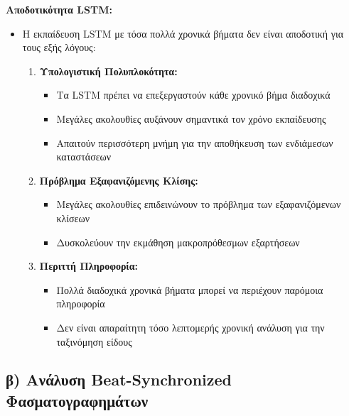 \documentclass[a4paper,12pt]{article}
\begin{document}
\textbf{Αποδοτικότητα LSTM:}
\begin{itemize}
   \item Η εκπαίδευση LSTM με τόσα πολλά χρονικά βήματα δεν είναι αποδοτική για τους εξής λόγους:
   \begin{enumerate}
       \item \textbf{Υπολογιστική Πολυπλοκότητα:}
       \begin{itemize}
           \item Τα LSTM πρέπει να επεξεργαστούν κάθε χρονικό βήμα διαδοχικά
           \item Μεγάλες ακολουθίες αυξάνουν σημαντικά τον χρόνο εκπαίδευσης
           \item Απαιτούν περισσότερη μνήμη για την αποθήκευση των ενδιάμεσων καταστάσεων
       \end{itemize}
       
       \item \textbf{Πρόβλημα Εξαφανιζόμενης Κλίσης:}
       \begin{itemize}
           \item Μεγάλες ακολουθίες επιδεινώνουν το πρόβλημα των εξαφανιζόμενων κλίσεων
           \item Δυσκολεύουν την εκμάθηση μακροπρόθεσμων εξαρτήσεων
       \end{itemize}
       
       \item \textbf{Περιττή Πληροφορία:}
       \begin{itemize}
           \item Πολλά διαδοχικά χρονικά βήματα μπορεί να περιέχουν παρόμοια πληροφορία
           \item Δεν είναι απαραίτητη τόσο λεπτομερής χρονική ανάλυση για την ταξινόμηση είδους
       \end{itemize}
   \end{enumerate}
\end{itemize}

\subsection*{β) Ανάλυση Beat-Synchronized Φασματογραφημάτων}
\end{document}
